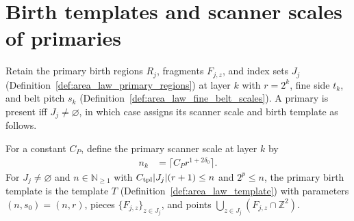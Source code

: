 \section{Birth templates and scanner scales of primaries}
\label{sec:area_law_primary_birth_templates}

Retain the primary birth regions $R_j$, fragments $F_{j,z}$, and index sets
$J_j$ (Definition~\ref{def:area_law_primary_regions}) at layer $k$ with
$r=2^k$, fine side $t_k$, and belt pitch $s_k$
(Definition~\ref{def:area_law_fine_belt_scales}). A primary is present iff
$J_j\ne\varnothing$, in which case \cite[Section~11]{OpenAI2026AreaLaw} assigns
its scanner scale and birth template as follows.


\begin{definition}
    \label{def:area_law_primary_birth_template}
    \leanok
    For a constant $C_P$, define the primary scanner scale at layer $k$ by
    \begin{align}
        n_k & =\bigl\lceil C_P r^{1+2\delta_0}\bigr\rceil.
        \label{eq:area_law_primary_scanner_scale}
    \end{align}
    For $J_j\ne\varnothing$ and $n\in\mathbb N_{\ge1}$ with
    $C_{\rm tpl}|J_j|(r+1)\le n$ and $2^p\le n$, the primary birth template is
    the template $T$ (Definition~\ref{def:area_law_template}) with parameters
    $(n,s_0)=(n,r)$, pieces $\{F_{j,z}\}_{z\in J_j}$, and points
    $\bigcup_{z\in J_j}(F_{j,z}\cap\mathbb Z^2)$.
\end{definition}

